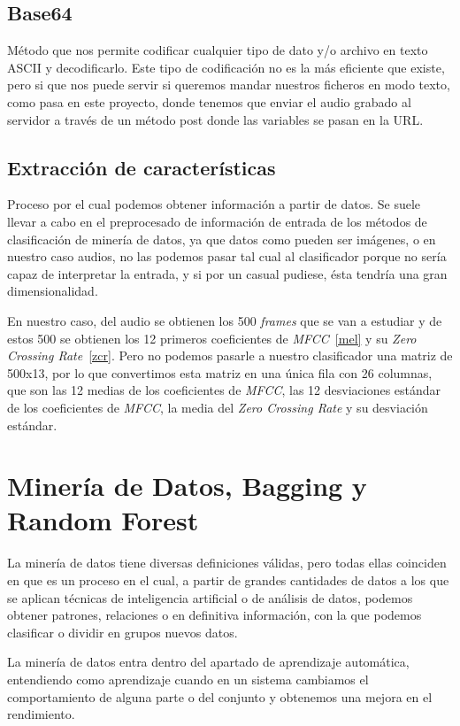 \subsection{Base64}
Método que nos permite codificar cualquier tipo de dato y/o archivo en texto ASCII y decodificarlo. Este tipo de codificación no es la más eficiente que existe, pero si que nos puede servir si queremos mandar nuestros ficheros en modo texto, como pasa en este proyecto, donde tenemos que enviar el audio grabado al servidor a través de un método post donde las variables se pasan en la URL.
\subsection{Extracción de características}
Proceso por el cual podemos obtener información a partir de datos. Se suele llevar a cabo en el preprocesado de información de entrada de los métodos de clasificación de minería de datos, ya que datos como pueden ser imágenes, o en nuestro caso audios, no las podemos pasar tal cual al clasificador porque no sería capaz de interpretar la entrada, y si por un casual pudiese, ésta tendría una gran dimensionalidad.

En nuestro caso, del audio se obtienen los 500 \textit{frames} que se van a estudiar y de estos 500 se obtienen los 12 primeros coeficientes de \textit{MFCC}~\ref{mel} y su \textit{Zero Crossing Rate}~\ref{zcr}. Pero no podemos pasarle a nuestro clasificador una matriz de 500x13, por lo que convertimos esta matriz en una única fila con 26 columnas, que son las 12 medias de los coeficientes de \textit{MFCC}, las 12 desviaciones estándar de los coeficientes de \textit{MFCC}, la media del \textit{Zero Crossing Rate} y su desviación estándar.

\section{Minería de Datos, Bagging y Random Forest}
La minería de datos tiene diversas definiciones válidas, pero todas ellas coinciden en que es un proceso en el cual, a partir de grandes cantidades de datos a los que se aplican técnicas de inteligencia artificial o de análisis de datos, podemos obtener patrones, relaciones o en definitiva información, con la que podemos clasificar o dividir en grupos nuevos datos.

La minería de datos entra dentro del apartado de aprendizaje automática, entendiendo como aprendizaje cuando en un sistema cambiamos el comportamiento de alguna parte o del conjunto y obtenemos una mejora en el rendimiento.

